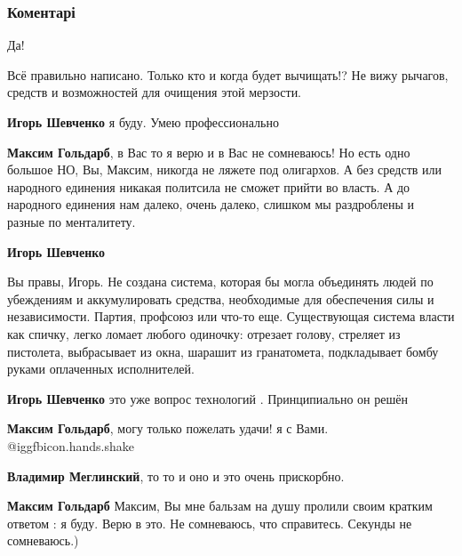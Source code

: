  
 
 
 
 
\subsubsection{Коментарі}

\begin{itemize} %
Да!

Всё правильно написано. Только кто и когда будет вычищать!? Не вижу рычагов, средств и возможностей для очищения этой мерзости.

\begin{itemize} %
\textbf{Игорь Шевченко} я буду. Умею профессионально

\textbf{Максим Гольдарб}, в Вас то я верю и в Вас не сомневаюсь! Но есть одно большое НО, Вы, Максим, никогда не ляжете под олигархов. А без средств или народного единения никакая политсила не сможет прийти во власть. А до народного единения нам далеко, очень далеко, слишком мы раздроблены и разные по менталитету.

\textbf{Игорь Шевченко} 

Вы правы, Игорь. Не создана система, которая бы могла объединять людей по
убеждениям и аккумулировать средства, необходимые для обеспечения силы и
независимости. Партия, профсоюз или что-то еще. Существующая система власти как
спичку, легко ломает любого одиночку: отрезает голову, стреляет из пистолета,
выбрасывает из окна, шарашит из гранатомета, подкладывает бомбу руками
оплаченных исполнителей.

\textbf{Игорь Шевченко} это уже вопрос технологий . Принципиально он решён

\textbf{Максим Гольдарб}, могу только пожелать удачи! я с Вами. @igg{fbicon.hands.shake} 

\textbf{Владимир Меглинский}, то то и оно и это очень прискорбно.

\textbf{Максим Гольдарб} Максим, Вы мне бальзам на душу пролили своим кратким ответом : я буду. Верю в это. Не сомневаюсь, что справитесь. Секунды не сомневаюсь.)


\end{itemize}
\end{itemize}
